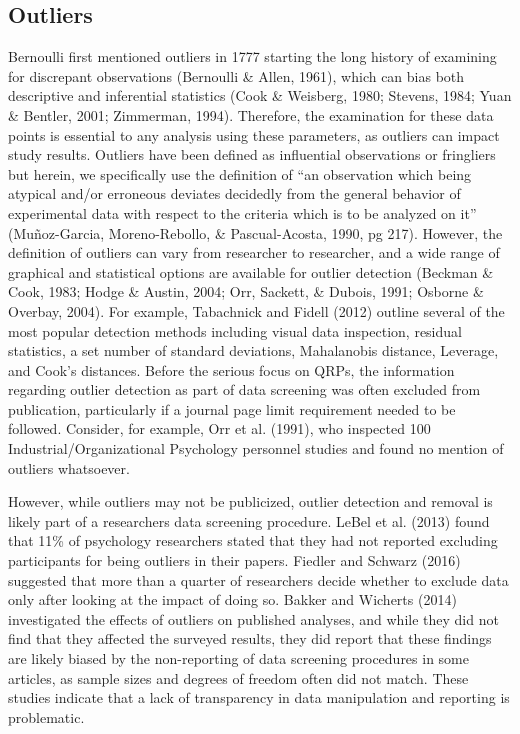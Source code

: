 \documentclass[english,man]{apa6}
\theoremstyle{definition}
\theoremstyle{definition}
\theoremstyle{definition}
\theoremstyle{remark}
\begin{document}
\subsection{Outliers}\label{outliers}

Bernoulli first mentioned outliers in 1777 starting the long history of
examining for discrepant observations (Bernoulli \& Allen, 1961), which
can bias both descriptive and inferential statistics (Cook \& Weisberg,
1980; Stevens, 1984; Yuan \& Bentler, 2001; Zimmerman, 1994). Therefore,
the examination for these data points is essential to any analysis using
these parameters, as outliers can impact study results. Outliers have
been defined as influential observations or fringliers but herein, we
specifically use the definition of \enquote{an observation which being
atypical and/or erroneous deviates decidedly from the general behavior
of experimental data with respect to the criteria which is to be
analyzed on it} (Muñoz-Garcia, Moreno-Rebollo, \& Pascual-Acosta, 1990,
pg 217). However, the definition of outliers can vary from researcher to
researcher, and a wide range of graphical and statistical options are
available for outlier detection (Beckman \& Cook, 1983; Hodge \& Austin,
2004; Orr, Sackett, \& Dubois, 1991; Osborne \& Overbay, 2004). For
example, Tabachnick and Fidell (2012) outline several of the most
popular detection methods including visual data inspection, residual
statistics, a set number of standard deviations, Mahalanobis distance,
Leverage, and Cook's distances. Before the serious focus on QRPs, the
information regarding outlier detection as part of data screening was
often excluded from publication, particularly if a journal page limit
requirement needed to be followed. Consider, for example, Orr et al.
(1991), who inspected 100 Industrial/Organizational Psychology personnel
studies and found no mention of outliers whatsoever.

However, while outliers may not be publicized, outlier detection and
removal is likely part of a researchers data screening procedure. LeBel
et al. (2013) found that 11\% of psychology researchers stated that they
had not reported excluding participants for being outliers in their
papers. Fiedler and Schwarz (2016) suggested that more than a quarter of
researchers decide whether to exclude data only after looking at the
impact of doing so. Bakker and Wicherts (2014) investigated the effects
of outliers on published analyses, and while they did not find that they
affected the surveyed results, they did report that these findings are
likely biased by the non-reporting of data screening procedures in some
articles, as sample sizes and degrees of freedom often did not match.
These studies indicate that a lack of transparency in data manipulation
and reporting is problematic.
\end{document}
